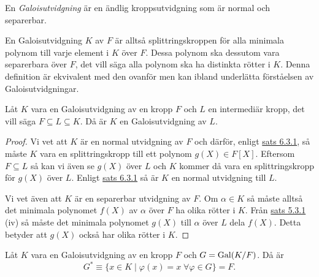 \documentclass{article}
\newcommand{\gal}[0]{\textnormal{Gal}}
\theoremstyle{definition}
\begin{document}
\begin{mydef}{}{}
  En \textit{Galoisutvidgning} är en ändlig kroppsutvidgning som är normal och separerbar.
\end{mydef}
En Galoisutvidgning $K$ av $F$ är alltså splittringskroppen för alla minimala polynom till varje element i $K$ över $F$. Dessa polynom ska 
dessutom vara separerbara över $F$, det vill säga alla polynom ska ha distinkta rötter i $K$. Denna 
definition är ekvivalent med den ovanför men kan ibland underlätta förståelsen av Galoisutvidgningar.

\hypertarget{lemma9.0.2}{}
\begin{mylemma}{}{}
  Låt $K$ vara en Galoisutvidgning av en kropp $F$ och $L$ en intermediär kropp, det vill säga $F \subseteq L \subseteq K$. Då är $K$ en 
  Galoisutvidgning av $L$.
\end{mylemma}

\begin{proof}
  Vi vet att $K$ är en normal utvidgning av $F$ och därför, enligt \hyperlink{sats6.3.1}{sats 6.3.1}, så måste $K$ vara en splittringskropp till 
  ett polynom $g(X) \in F[X]$. Eftersom $F \subseteq L$ så kan vi även se $g(X)$ över $L$ och $K$ kommer då vara en splittringskropp för $g(X)$ över $L$. 
  Enligt \hyperlink{sats6.3.1}{sats 6.3.1} så är $K$ en normal utvidgning till $L$.

  Vi vet även att $K$ är en separerbar utvidgning av $F$. Om $\alpha \in K$ så måste alltså det minimala polynomet $f(X)$ av $\alpha$ över $F$ 
  ha olika rötter i $K$. Från \hyperlink{minpol}{sats 5.3.1} (iv) så måste det minimala polynomet $g(X)$ till $\alpha$ över $L$ dela $f(X)$.
  Detta betyder att $g(X)$ också har olika rötter i $K$.
\end{proof}

\hypertarget{lemma9.0.3}{}
\begin{mylemma}{}{}
  Låt $K$ vara en Galoisutvidgning av en kropp $F$ och $G = \gal(K/F)$. Då är 
  \[G^* \equiv \{x \in K \; | \; \varphi(x) = x \; \forall \varphi \in G\} = F.\]
\end{mylemma}
\end{document}
